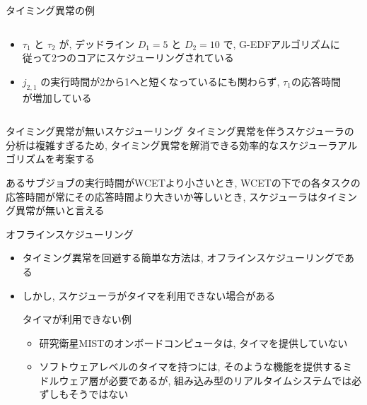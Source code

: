 \begin{frame}{タイミング異常の例}
    \begin{columns}
        \begin{column}{0.5\textwidth}
            \begin{itemize}
                \item $\tau_{1}$ と $\tau_{2}$ が, デッドライン $D_{1}=5$ と $D_{2}=10$ で, G-EDFアルゴリズムに従って2つのコアにスケジューリングされている
                \item $j_{2,1}$ の実行時間が2から1へと短くなっているにも関わらず, $\tau_1$の応答時間が増加している
            \end{itemize}
        \end{column}
        \begin{column}{0.5\textwidth}
        \end{column}
    \end{columns}
\end{frame}

\begin{frame}{タイミング異常が無いスケジューリング}
    タイミング異常を伴うスケジューラの分析は複雑すぎるため, タイミング異常を解消できる効率的なスケジューラアルゴリズムを考案する
    \begin{definition}[タイミング異常が無い]
        あるサブジョブの実行時間がWCETより小さいとき, WCETの下での各タスクの応答時間が常にその応答時間より大きいか等しいとき, スケジューラはタイミング異常が無いと言える
    \end{definition}
\end{frame}

\begin{frame}{オフラインスケジューリング}
    \begin{itemize}
        \item タイミング異常を回避する簡単な方法は, オフラインスケジューリングである
        \item しかし, スケジューラがタイマを利用できない場合がある
              \begin{block}{タイマが利用できない例}
                  \setlength{\linewidth}{0.98\columnwidth}
                  \begin{itemize}
                      \item 研究衛星MISTのオンボードコンピュータは, タイマを提供していない
                      \item ソフトウェアレベルのタイマを持つには, そのような機能を提供するミドルウェア層が必要であるが, 組み込み型のリアルタイムシステムでは必ずしもそうではない
                  \end{itemize}
              \end{block}
    \end{itemize}
\end{frame}

